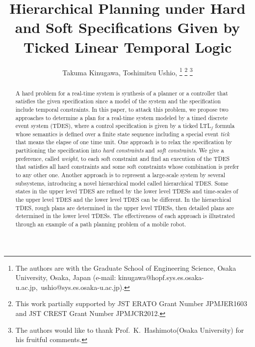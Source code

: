 \documentclass[journal,twoside,web]{IEEEtran}
\begin{document}
%
\title{Hierarchical Planning under Hard and Soft  Specifications Given by Ticked Linear Temporal Logic}
%
\author{Takuma Kinugawa, Toshimitsu Ushio, 
\thanks{The authors are with the Graduate School of Engineering Science, Osaka
University, Osaka, Japan (e-mail: kinugawa@hopf.sys.es.osaka-u.ac.jp,\ ushio@sys.es.osaka-u.ac.jp). }
\thanks{This work partially supported by JST ERATO Grant Number JPMJER1603 and JST CREST Grant Number JPMJCR2012.}
\thanks{The authors would like to thank Prof.\ K.\ Hashimoto(Osaka University) for his fruitful comments.}
}
\maketitle

\begin{abstract}
A hard problem for a real-time system is synthesis of a  planner or a controller that satisfies the given specification since a model of the system and the specification include temporal constraints.
In this paper, to attack this problem, we propose two approaches to determine a plan for a real-time system modeled by a timed discrete event system (TDES), where a control specification is given by a ticked LTL$_f$ formula whose semantics is defined over a finite state sequence including a special event \textit{tick} that means the elapse of one time unit.
One approach is to relax the specification by partitioning the specification into \textit{hard constraints} and \textit{soft constraints}.
We give a preference, called \textit{weight}, to each soft constraint and find an execution of the TDES that satisfies all hard constraints and some soft constraints whose combination is prefer to any other one. 
Another approach is to represent a large-scale system by several subsystems, introducing a novel hierarchical model called hierarchical TDES.
Some states in the upper level TDES are refined by the lower level TDESs and time-scales of the upper level TDES and the lower level TDES can be different.
In the hierarchical TDES, rough plans are determined in the upper level TDESs, then detailed plans are determined in the lower level TDESs.
%
The effectiveness of each approach is illustrated through an example of a path planning problem of a mobile robot.
%
\end{abstract}
\end{document}
